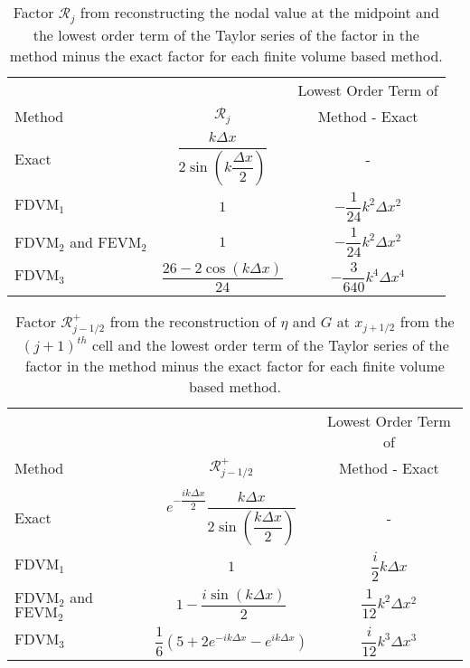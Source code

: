\begin{table}
	\centering
	\begin{tabular}{l  c  c}
		&&Lowest Order Term of	\\
		Method& $\mathcal{R}_j$& Method - Exact  \B \\
		\hline 
		Exact &$\dfrac{k\Delta x}{2 \sin \left(k\dfrac{\Delta x}{2}\right)}$ & - \T \B \\
		$\text{FDVM}_1$ & $1$ & $-\dfrac{1}{24}k^2 \Delta x^2$ \T \B \\
		$\text{FDVM}_2$ and $\text{FEVM}_2$& $1$ & $-\dfrac{1}{24}k^2 \Delta x^2$ \T \B \\
		$\text{FDVM}_3$& $\dfrac{26 - 2 \cos\left(k \Delta x\right)}{24}$ & $-\dfrac{3}{640}k^4 \Delta x^4$ \T \B  \\
		\hline	\end{tabular}
	\caption{Factor $\mathcal{R}_j$ from reconstructing the nodal value at the midpoint and the lowest order term of the Taylor series of the factor in the method minus the exact factor for each finite volume based method.}
	\label{tab:Mfactor}
\end{table}
\begin{table}
	\centering
	\begin{tabular}{l  c  c}
		&&Lowest Order Term of	\\
		Method & $\mathcal{R}^+_{j-1/2}$ & Method - Exact \B\\
		\hline \\
		Exact & $e^{-\dfrac{ik\Delta x}{2}}\dfrac{k\Delta x}{2 \sin\left(\dfrac{k \Delta x}{2}\right)}$ & -  \\
		$\text{FDVM}_1$ & $1$ & $\dfrac{i}{2}k \Delta x$ \T\B \\
		$\text{FDVM}_2$ and $\text{FEVM}_2$& $ 1 - \dfrac{i \sin\left(k\Delta x \right)}{2}$ & $\dfrac{1}{12}k^2 \Delta x^2$  \T\B\\
		$\text{FDVM}_3$& $\dfrac{1}{6}\left({5 + 2e^{-i k {\Delta x}} - e^{i k {\Delta x}}} \right)$ & $\dfrac{i}{12}k^3 \Delta x^3$  \T\B \\
		\hline
	\end{tabular}
	\caption{Factor $\mathcal{R}^+_{j-1/2}$ from the reconstruction of $\eta$ and $G$ at $x_{j+1/2}$ from the ${(j+1)^{th}}$ cell and the lowest order term of the Taylor series of the factor in the method minus the exact factor for each finite volume based method. }
	\label{tab:Rpfactor}
\end{table}
